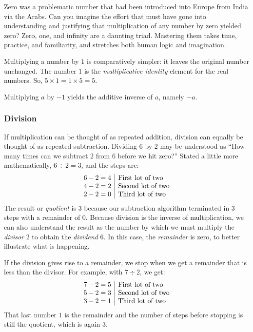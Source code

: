 \documentclass[
  a4paper,
]{article}
\begin{document}
Zero was a problematic number that had been introduced into Europe from
India via the Arabs. Can you imagine the effort that must have gone into
understanding and justifying that multiplication of any number by zero
yielded zero? Zero, one, and infinity are a daunting triad. Mastering
them takes time, practice, and familiarity, and stretches both human
logic and imagination.

Multiplying a number by \(1\) is comparatively simpler: it leaves the
original number unchanged. The number \(1\) is the \emph{multiplicative
identity} element for the real numbers. So,
\(5 \times 1 = 1 \times 5 = 5\).

Multiplying \(a\) by \(-1\) yields the additive inverse of \(a\), namely
\(-a\).

\hypertarget{division}{%
\subsubsection{Division}\label{division}}

If multiplication can be thought of as repeated addition, division can
equally be thought of as repeated subtraction. Dividing \(6\) by \(2\)
may be understood as ``How many times can we subtract \(2\) from \(6\)
before we hit zero?'' Stated a little more mathematically,
\(6 \div 2 = 3\), and the steps are: \[
\begin{array}{r | l}
6 - 2 = 4 & \mbox{First lot of two}\\
4 - 2 = 2 & \mbox{Second lot of two}\\
2 - 2 = 0 & \mbox{Third lot of two}\\
\end{array}
\] The result or \emph{quotient} is \(3\) because our subtraction
algorithm terminated in \(3\) steps with a remainder of \(0\). Because
division is the inverse of multiplication, we can also understand the
result as the number by which we must multiply the \emph{divisor} \(2\)
to obtain the \emph{dividend} \(6\). In this case, the \emph{remainder}
is zero, to better illustrate what is happening.

If the division gives rise to a remainder, we stop when we get a
remainder that is less than the divisor. For example, with \(7 \div 2\),
we get: \[
\begin{array}{r | l}
7 - 2 = 5 & \mbox{First lot of two}\\
5 - 2 = 3 & \mbox{Second lot of two}\\
3 - 2 = 1 & \mbox{Third lot of two}\\
\end{array}
\] That last number \(1\) is the remainder and the number of steps
before stopping is still the quotient, which is again \(3\).
\end{document}
